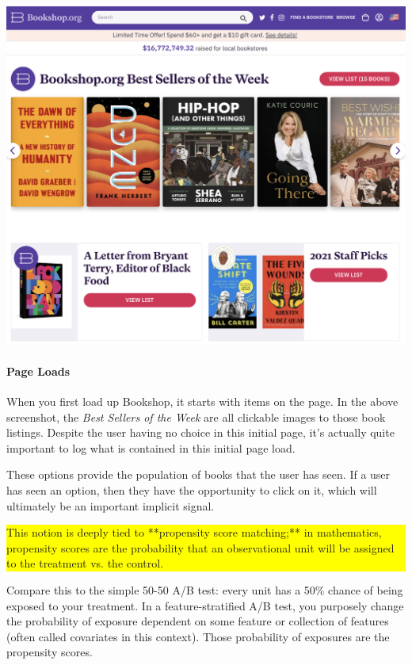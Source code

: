 \vspace{10pt}
\includegraphics[width=\textwidth-10pt]{book-text/bookshop-landingpage.png}

\paragraph{Page Loads}

When you first load up Bookshop, it starts with items on the page. In the above screenshot, the \emph{Best Sellers of the Week} are all clickable images to those book listings. Despite the user having no choice in this initial page, it's actually quite important to log what is contained in this initial page load. 

These options provide the population of books that the user has seen. If a user has seen an option, then they have the opportunity to click on it, which will ultimately be an important implicit signal. 


\vspace{10pt}
\colorbox{yellow}{\parbox{\textwidth}{ This notion is deeply tied to **propensity score matching;** in mathematics, propensity scores are the probability that an observational unit will be assigned to the treatment vs. the control.
}}
\vspace{10pt}

Compare this to the simple 50-50 A/B test: every unit has a 50\% chance of being exposed to your treatment. In a feature-stratified A/B test, you purposely change the probability of exposure dependent on some feature or collection of features (often called covariates in this context). Those probability of exposures are the propensity scores. 

